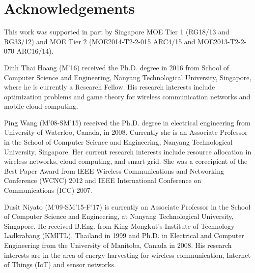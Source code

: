 \documentclass[twocolumn,10pt]{IEEEtran}
\begin{document}
\section*{Acknowledgements}

This work was supported in part by Singapore MOE Tier 1 (RG18/13 and RG33/12) and MOE Tier 2 (MOE2014-T2-2-015 ARC4/15 and MOE2013-T2-2-070 ARC16/14).








\clearpage
\begin{IEEEbiography} {Dinh Thai Hoang} (M'16) received the Ph.D. degree in 2016 from School of Computer Science and Engineering, Nanyang Technological University, Singapore, where he is currently a Research Fellow. His research interests include optimization problems and game theory for wireless communication networks and mobile cloud computing.
\end{IEEEbiography}
\vspace{-13cm}


\begin{IEEEbiography} {Ping Wang} (M'08-SM'15) received the Ph.D. degree in electrical engineering from University of Waterloo, Canada, in 2008. Currently she is an Associate Professor in the School of Computer Science and Engineering, Nanyang Technological University, Singapore. Her current research interests include resource allocation in wireless networks, cloud computing, and smart grid. She was a corecipient of the Best Paper Award from IEEE Wireless Communications and Networking Conference (WCNC) 2012 and IEEE International Conference on Communications (ICC) 2007.
\end{IEEEbiography}
\vspace{-13cm}


\begin{IEEEbiography}{Dusit Niyato} (M'09-SM'15-F'17) is currently an Associate Professor in the School of Computer Science and Engineering, at Nanyang Technological University, Singapore. He received B.Eng. from King Mongkut's Institute of Technology Ladkrabang (KMITL), Thailand in 1999 and Ph.D. in Electrical and Computer Engineering from the University of Manitoba, Canada in 2008. His research interests are in the area of energy harvesting for wireless communication, Internet of Things (IoT) and sensor networks.
\end{IEEEbiography}
\end{document}
